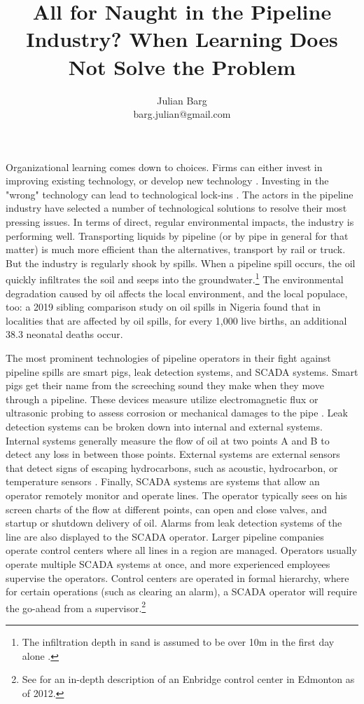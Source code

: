 \documentclass[12pt, man, natbib]{apa6}
\title{All for Naught in the Pipeline Industry? When Learning Does Not Solve the Problem}
\author{Julian Barg\\barg.julian@gmail.com}
\affiliation{Ivey Business School}
\begin{document}
	
	\maketitle
	
	\singlespacing
	
	\section{}
	
	Organizational learning comes down to choices. Firms can either invest in improving existing technology, or develop new technology \citep{March1991}. Investing in the "wrong" technology can lead to technological lock-ins \citep{Levinthal1993}. The actors in the pipeline industry have selected a number of technological solutions to resolve their most pressing issues. In terms of direct, regular environmental impacts, the industry is performing well. Transporting liquids by pipeline (or by pipe in general for that matter) is much more efficient than the alternatives, transport by rail or truck. But the industry is regularly shook by spills. When a pipeline spill occurs, the oil quickly infiltrates the soil and seeps into the groundwater.\footnote{The infiltration depth in sand is assumed to be over 10m in the first day alone \citep{Bonvicini2015}.} The environmental degradation caused by oil affects the local environment, and the local populace, too: a 2019 sibling comparison study on oil spills in Nigeria found that in localities that are affected by oil spills, for every 1,000 live births, an additional 38.3 neonatal deaths occur\citep{Bruederle2019}.
	
	The most prominent technologies of pipeline operators in their fight against pipeline spills are smart pigs, leak detection systems, and SCADA systems. Smart pigs get their name from the screeching sound they make when they move through a pipeline. These devices measure utilize electromagnetic flux or ultrasonic probing to assess corrosion or mechanical damages to the pipe \citep{Singh2017-7}. Leak detection systems can be broken down into internal and external systems. Internal systems generally measure the flow of oil at two points A and B to detect any loss in between those points. External systems are external sensors that detect signs of escaping hydrocarbons, such as acoustic, hydrocarbon, or temperature sensors \citep{Shaw2012}. Finally, SCADA systems are systems that allow an operator remotely monitor and operate lines. The operator typically sees on his screen charts of the flow at different points, can open and close valves, and startup or shutdown delivery of oil. Alarms from leak detection systems of the line are also displayed to the SCADA operator. Larger pipeline companies operate control centers where all lines in a region are managed. Operators usually operate multiple SCADA systems at once, and more experienced employees supervise the operators. Control centers are operated in formal hierarchy, where for certain operations (such as clearing an alarm), a SCADA operator will require the go-ahead from a supervisor.\footnote{See \citet{NTSB2012} for an in-depth description of an Enbridge control center in Edmonton as of 2012.}
\end{document}
